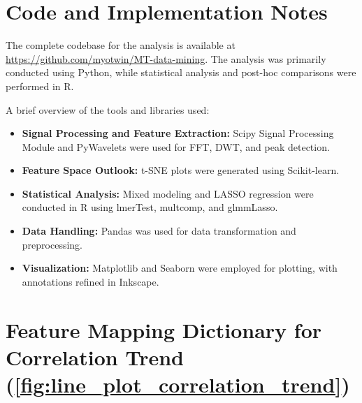\documentclass{report}
\begin{document}
    \section{Code and Implementation Notes}
        The complete codebase for the analysis is available at \url{https://github.com/myotwin/MT-data-mining}. The analysis was primarily conducted using Python, while statistical analysis and post-hoc comparisons were performed in R.
        
        A brief overview of the tools and libraries used:
        \begin{itemize}
            \item \textbf{Signal Processing and Feature Extraction:} Scipy Signal Processing Module and PyWavelets were used for FFT, DWT, and peak detection.
            \item \textbf{Feature Space Outlook:} t-SNE plots were generated using Scikit-learn.
            \item \textbf{Statistical Analysis:} Mixed modeling and LASSO regression were conducted in R using lmerTest, multcomp, and glmmLasso.
            \item \textbf{Data Handling:} Pandas was used for data transformation and preprocessing.
            \item \textbf{Visualization:} Matplotlib and Seaborn were employed for plotting, with annotations refined in Inkscape.
        \end{itemize}



\small
\section {Feature Mapping Dictionary for Correlation Trend (\ref{fig:line_plot_correlation_trend})}
\label{feature-mapping}

\end{document}

